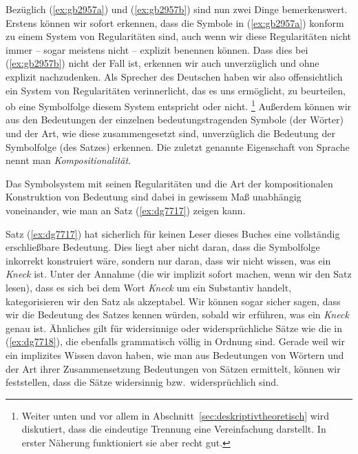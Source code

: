 \begin{exe}
  \ex
  \begin{xlist}
  \end{xlist}
\end{exe}


Bezüglich (\ref{ex:gb2957a}) und (\ref{ex:gb2957b}) sind nun zwei Dinge bemerkenswert.
Erstens können wir sofort erkennen, dass die Symbole in (\ref{ex:gb2957a}) konform zu einem System von Regularitäten sind, auch wenn wir diese Regularitäten nicht immer -- sogar meistens nicht -- explizit benennen können.
Dass dies bei (\ref{ex:gb2957b}) nicht der Fall ist, erkennen wir auch unverzüglich und ohne explizit nachzudenken.
Als Sprecher des Deutschen haben wir also offensichtlich ein System von Regularitäten verinnerlicht, das es uns ermöglicht, zu beurteilen, ob eine Symbolfolge diesem System entspricht oder nicht.%
\footnote{Weiter unten und vor allem in Abschnitt~\ref{sec:deskriptivtheoretisch} wird diskutiert, dass die eindeutige Trennung eine Vereinfachung darstellt.
In erster Näherung funktioniert sie aber recht gut.}
Außerdem können wir aus den Bedeutungen der einzelnen bedeutungstragenden Symbole (der Wörter) und der Art, wie diese zusammengesetzt sind, unverzüglich die Bedeutung der Symbolfolge (des Satzes) erkennen.
Die zuletzt genannte Eigenschaft von Sprache nennt man \textit{Kompositionalität}.


Das Symbolsystem mit seinen Regularitäten und die Art der kompositionalen Konstruktion von Bedeutung sind dabei in gewissem Maß unabhängig voneinander, wie man an Satz (\ref{ex:dg7717}) zeigen kann.

\begin{exe}
\end{exe}

Satz (\ref{ex:dg7717}) hat sicherlich für keinen Leser dieses Buches eine vollständig er\-schließ\-bare Bedeutung.
Dies liegt aber nicht daran, dass die Symbolfolge inkorrekt konstruiert wäre, sondern nur daran, dass wir nicht wissen, was ein \textit{Kneck} ist.
Unter der Annahme (die wir implizit sofort machen, wenn wir den Satz lesen), dass es sich bei dem Wort \textit{Kneck} um ein Substantiv handelt, kategorisieren wir den Satz als akzeptabel.
Wir können sogar sicher sagen, dass wir die Bedeutung des Satzes kennen würden, sobald wir erführen, was ein \textit{Kneck} genau ist.
Ähnliches gilt für widersinnige oder widersprüchliche Sätze wie die in (\ref{ex:dg7718}), die ebenfalls grammatisch völlig in Ordnung sind.
Gerade weil wir ein implizites Wissen davon haben, wie man aus Bedeutungen von Wörtern und der Art ihrer Zusammensetzung Bedeutungen von Sätzen ermittelt, können wir feststellen, dass die Sätze widersinnig bzw.\ widersprüchlich sind.

